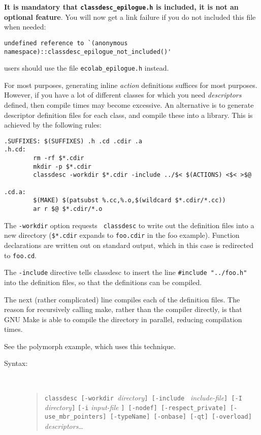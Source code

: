 {\bf It is mandatory that \verb+classdesc_epilogue.h+\label{classdesc_epilogue} is included, it is not
  an optional feature}. You will now get a link failure if you do not
included this file when needed:
\begin{verbatim}
undefined reference to `(anonymous namespace)::classdesc_epilogue_not_included()'
\end{verbatim}
\EcoLab{} users should use the file
  \verb+ecolab_epilogue.h+ instead.

\label{library-method} 

For most purposes, generating inline {\em action} definitions suffices
for most purposes. However, if you have a lot of different classes for
which you need {\em descriptors} defined, then compile times may become
excessive. An alternative is to generate descriptor definition files for each
class, and compile these into a library. This is
achieved by the following rules:

\begin{verbatim}
.SUFFIXES: $(SUFFIXES) .h .cd .cdir .a
.h.cd:
        rm -rf $*.cdir 
        mkdir -p $*.cdir      
        classdesc -workdir $*.cdir -include ../$< $(ACTIONS) <$< >$@

.cd.a:
        $(MAKE) $(patsubst %.cc,%.o,$(wildcard $*.cdir/*.cc))
        ar r $@ $*.cdir/*.o
\end{verbatim}

The {\tt -workdir} option requests {\tt
classdesc} to write out the definition files into a
new directory (\verb+$*.cdir+ %
 expands to {\tt foo.cdir} in the foo
example). Function declarations are written out on standard output,
which in this case is redirected to {\tt foo.cd}.

The {\tt -include} directive tells classdesc to insert
the line \verb+#include "../foo.h"+ into the definition files, so that
the definitions can be compiled.

The next (rather complicated) line compiles each of the definition
files. The reason for recursively calling make, rather than the compiler
directly, is that GNU Make is able to compile the directory in
parallel, reducing compilation times. 

See the polymorph example, which uses this technique.


\begin{description}
\item[Syntax:]\mbox{}\\
\begin{quote}
{\tt classdesc [-workdir }{\em directory}{\tt ] [-include }{\em
  include-file}{\tt ] [-I} {\em directory}{\tt]} {\tt [-i} {\em
  input-file} {\tt] [-nodef]
  [-respect\_private] [-use\_mbr\_pointers] [-typeName] [-onbase] [-qt]
  [-overload]} {\em descriptors\ldots}
\end{quote}
\end{description}

